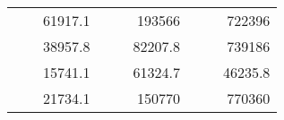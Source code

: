 \begin{table}[]
\begin{tabular}{|ccrccrccc}
\rowcolor[HTML]{DDFDFF} 
\multicolumn{1}{|c|}{\cellcolor[HTML]{FFFFC7}}                                & \multicolumn{1}{c|}{\cellcolor[HTML]{DDFDFF}}                      & \multicolumn{1}{r|}{\cellcolor[HTML]{DAE8FC}61917.1}   & \multicolumn{1}{c|}{\cellcolor[HTML]{FFFFC7}}                                & \multicolumn{1}{c|}{\cellcolor[HTML]{DDFDFF}}                       & \multicolumn{1}{r|}{\cellcolor[HTML]{DDFDFF}193566}    & \multicolumn{1}{c|}{\cellcolor[HTML]{FFFFC7}}                                & \multicolumn{1}{c|}{\cellcolor[HTML]{DDFDFF}}                      & \multicolumn{1}{r|}{\cellcolor[HTML]{DDFDFF}722396}    \\ \cline{3-3} \cline{6-6} \cline{9-9} 
\multicolumn{1}{|c|}{\cellcolor[HTML]{FFFFC7}}                                & \multicolumn{1}{c|}{\cellcolor[HTML]{DDFDFF}}                      & \multicolumn{1}{r|}{\cellcolor[HTML]{DDFDFF}38957.8}   & \multicolumn{1}{c|}{\cellcolor[HTML]{FFFFC7}}                                & \multicolumn{1}{c|}{\cellcolor[HTML]{DDFDFF}}                       & \multicolumn{1}{r|}{\cellcolor[HTML]{DAE8FC}82207.8}   & \multicolumn{1}{c|}{\cellcolor[HTML]{FFFFC7}}                                & \multicolumn{1}{c|}{\cellcolor[HTML]{DDFDFF}}                      & \multicolumn{1}{r|}{\cellcolor[HTML]{DAE8FC}739186}    \\ \cline{3-3} \cline{6-6} \cline{9-9} 
\rowcolor[HTML]{DDFDFF} 
\multicolumn{1}{|c|}{\cellcolor[HTML]{FFFFC7}}                                & \multicolumn{1}{c|}{\cellcolor[HTML]{DDFDFF}}                      & \multicolumn{1}{r|}{\cellcolor[HTML]{DAE8FC}15741.1}   & \multicolumn{1}{c|}{\cellcolor[HTML]{FFFFC7}}                                & \multicolumn{1}{c|}{\cellcolor[HTML]{DDFDFF}}                       & \multicolumn{1}{r|}{\cellcolor[HTML]{DDFDFF}61324.7}   & \multicolumn{1}{c|}{\cellcolor[HTML]{FFFFC7}}                                & \multicolumn{1}{c|}{\cellcolor[HTML]{DDFDFF}}                      & \multicolumn{1}{r|}{\cellcolor[HTML]{DDFDFF}46235.8}   \\ \cline{3-3} \cline{6-6} \cline{9-9} 
\multicolumn{1}{|c|}{\cellcolor[HTML]{FFFFC7}}                                & \multicolumn{1}{c|}{\cellcolor[HTML]{DDFDFF}}                      & \multicolumn{1}{r|}{\cellcolor[HTML]{DDFDFF}21734.1}   & \multicolumn{1}{c|}{\cellcolor[HTML]{FFFFC7}}                                & \multicolumn{1}{c|}{\cellcolor[HTML]{DDFDFF}}                       & \multicolumn{1}{r|}{\cellcolor[HTML]{DAE8FC}150770}    & \multicolumn{1}{c|}{\cellcolor[HTML]{FFFFC7}}                                & \multicolumn{1}{c|}{\cellcolor[HTML]{DDFDFF}}                      & \multicolumn{1}{r|}{\cellcolor[HTML]{DAE8FC}770360}    \\ \cline{3-3} \cline{6-6} \cline{9-9} 

\end{tabular}
\end{table}

